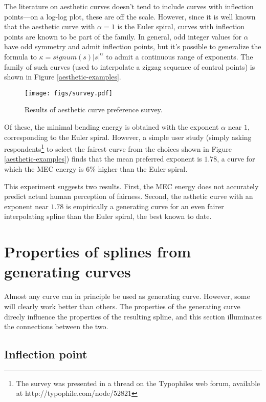 \documentclass{article}
\begin{document}
The literature on aesthetic curves doesn't tend to include curves with
inflection points---on a log-log plot, these are off the
scale. However, since it is well known that the aesthetic curve with
$\alpha=1$ is the Euler spiral, curves with inflection points are
known to be part of the family. In general, odd integer values for
$\alpha$ have odd symmetry and admit inflection points, but it's
possible to generalize the formula to $\kappa = signum(s)|s|^\alpha$
to admit a continuous range of exponents. The family of such curves
(used to interpolate a zigzag sequence of control points) is shown in
Figure \ref{aesthetic-examples}.

\begin{figure*}[tbh]
\begin{center}
\texttt{[image: figs/survey.pdf]}
\caption{\label{survey-results}Results of aesthetic curve preference survey.}
\end{center}
\end{figure*}

Of these, the minimal bending energy is obtained with the exponent
$\alpha$ near $1$, corresponding to the Euler spiral. However, a
simple user study (simply asking respondents\footnote{The survey was
  presented in a thread on the Typophiles web forum, available at
  http://typophile.com/node/52821} to select the fairest curve from the
  choices shown in Figure \ref{aesthetic-examples}) finds that the
mean preferred exponent is $1.78$, a curve for which the MEC energy
is 6\% higher than the Euler spiral.

This experiment suggests two results. First, the MEC energy does not
accurately predict actual human perception of fairness. Second, the
asthetic curve with an exponent near $1.78$ is empirically a
generating curve for
an even fairer interpolating spline than the Euler spiral, the best
known to date.

\section{Properties of splines from generating curves}

Almost any curve can in principle be used as generating
curve. However, some will clearly work better than others. The
properties of the generating curve direcly influence the properties of
the resulting spline, and this section illuminates the connections
between the two.


\subsection{Inflection point}
\end{document}
